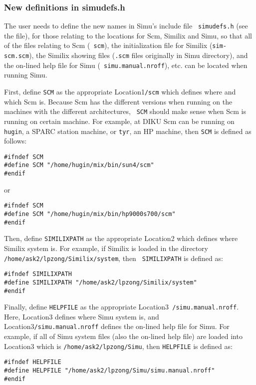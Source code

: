 \begin{sloppypar}
\subsubsection{New definitions in simudefs.h}

The user needs to define the new names in Simu's include file {\tt
simudefs.h} (see the file), for those relating to the locations for
Scm, Similix and Simu, so that all of the files relating to Scm ({\tt
scm}), the initialization file for Similix ({\tt sim-scm.scm}), the
Similix showing files ({\tt *.scm} files originally in Simu
directory), and the on-lined help file for Simu ({\tt
simu.manual.nroff}), etc. can be located when running Simu.

First, define {\tt SCM} as the appropriate Location1{\tt /scm} which
defines where and which Scm is. Because Scm has the different versions
when running on the machines with the different architectures, {\tt
SCM} should make sense when Scm is running on certain machine. For
example, at DIKU Scm can be running on {\tt hugin}, a SPARC station
machine, or {\tt tyr}, an HP machine, then {\tt SCM} is defined as
follows:

\begin{verbatim}
#ifndef SCM
#define SCM "/home/hugin/mix/bin/sun4/scm"
#endif
\end{verbatim}
   or
\begin{verbatim}
#ifndef SCM
#define SCM "/home/hugin/mix/bin/hp9000s700/scm"
#endif
\end{verbatim}

Then, define {\tt SIMILIXPATH} as the appropriate Location2 which
defines where Similix system is.  For example, if Similix is loaded in
the directory {\tt /home/ask2/lpzong/Similix/system}, then {\tt
SIMILIXPATH} is defined as:

\begin{verbatim}
#ifndef SIMILIXPATH
#define SIMILIXPATH "/home/ask2/lpzong/Similix/system"
#endif
\end{verbatim}

Finally, define {\tt HELPFILE} as the appropriate Location3{\tt
/simu.manual.nroff}. Here, Location3 defines where Simu system is, and
Location3{\tt /simu.manual.nroff} defines the on-lined help file for
Simu. For example, if all of Simu system files (also the on-lined help
file) are loaded into Location3 which is {\tt /home/ask2/lpzong/Simu},
then {\tt HELPFILE} is defined as:

\begin{verbatim}
#ifndef HELPFILE
#define HELPFILE "/home/ask2/lpzong/Simu/simu.manual.nroff"
#endif
\end{verbatim}



\end{sloppypar}
